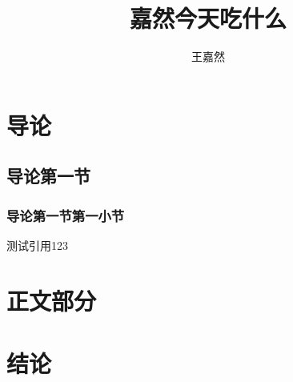 \documentclass[a4paper]{SWUThesis}
\title{嘉然今天吃什么}                           %
\author{王嘉然}                                 %
\begin{document}
\maketitle
\makecontents
\makeabstract
\section{导论}
\subsection{导论第一节}
\subsubsection{导论第一节第一小节}
测试引用\cite{1}1\cite{2}2\cite{3}3
\section{正文部分}
\section{结论}
\makereference
\makeappendix
\end{document}
